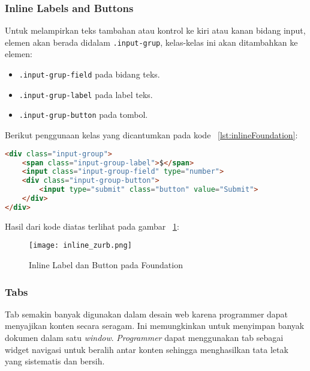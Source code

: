 \subsubsection{Inline Labels and Buttons}
Untuk melampirkan teks tambahan atau kontrol ke kiri atau kanan bidang input, elemen akan berada didalam \texttt{.input-grup}, kelas-kelas ini akan ditambahkan ke elemen:
\begin{itemize}
	\item \texttt{.input-grup-field} pada bidang teks.
	\item \texttt{.input-grup-label} pada label teks.
	\item \texttt{.input-grup-button} pada tombol. 
\end{itemize}

\noindent Berikut penggunaan kelas yang dicantumkan pada kode ~\ref{lst:inlineFoundation}:
\begin{lstlisting}[style=customhtml, language=HTML,  basicstyle=\ttfamily, frame=single, columns=fullflexible, keepspaces=true, breaklines=true, showstringspaces=false, label={lst:inlineFoundation}, caption=Select menus pada foundation 6.] 
<div class="input-group">
	<span class="input-group-label">$</span>
	<input class="input-group-field" type="number">
	<div class="input-group-button">
		<input type="submit" class="button" value="Submit">
	</div>
</div>
\end{lstlisting}

\noindent Hasil dari kode diatas terlihat pada gambar ~\ref{fig:inlineFoundation}:
\begin{figure} [H]
	\centering  
	\texttt{[image: inline\_zurb.png]}  
	\caption{Inline Label dan Button pada Foundation}
	\label{fig:inlineFoundation}
\end{figure}

\subsubsection{Tabs}
Tab semakin banyak digunakan dalam desain web karena programmer dapat menyajikan konten secara seragam. Ini memungkinkan untuk menyimpan banyak dokumen dalam satu \textit{window}. \textit{Programmer} dapat menggunakan tab sebagai widget navigasi untuk beralih antar konten sehingga menghasilkan tata letak yang sistematis dan bersih.\\

